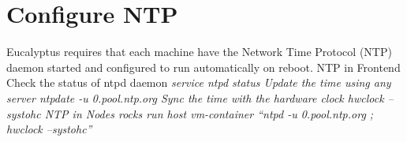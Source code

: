 \section{Configure NTP}

Eucalyptus requires that each machine have the Network Time Protocol (NTP) daemon started and configured to run automatically on reboot.
\linebreak
NTP in Frontend
\linebreak
Check the status of ntpd daemon 
\em{service ntpd status}
\linebreak
Update the time using any server
\em{ntpdate -u 0.pool.ntp.org}
\linebreak
Sync the time with the hardware clock 
\em{hwclock --systohc}
\linebreak
NTP in Nodes
\em{rocks run host vm-container “ntpd -u 0.pool.ntp.org ; hwclock --systohc”}


